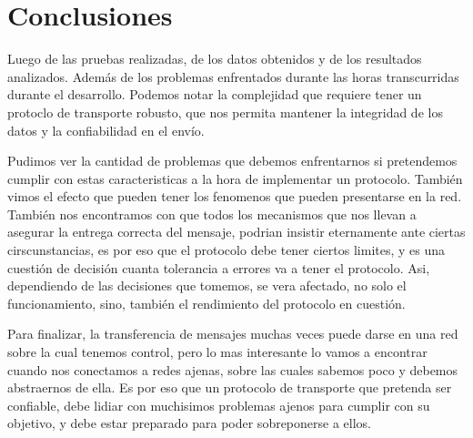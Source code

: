 \section{Conclusiones}

Luego de las pruebas realizadas, de los datos obtenidos y de los resultados analizados. Adem\'as de los problemas enfrentados durante las horas transcurridas durante el desarrollo. Podemos notar la complejidad que requiere tener un protoclo de transporte robusto, que nos permita mantener la integridad de los datos y la confiabilidad en el env\'io.

Pudimos ver la cantidad de problemas que debemos enfrentarnos si pretendemos cumplir con estas caracteristicas a la hora de implementar un protocolo. Tambi\'en vimos el efecto que pueden tener los fenomenos que pueden presentarse en la red.
Tambi\'en nos encontramos con que todos los mecanismos que nos llevan a asegurar la entrega correcta del mensaje, podrian insistir eternamente ante ciertas cirscunstancias, es por eso que el protocolo debe tener ciertos limites, y es una cuesti\'on de decisi\'on cuanta tolerancia a errores va a tener el protocolo. Asi, dependiendo de las decisiones que tomemos, se vera afectado, no solo el funcionamiento, sino, tambi\'en el rendimiento del protocolo en cuesti\'on.

Para finalizar, la transferencia de mensajes muchas veces puede darse en una red sobre la cual tenemos control, pero lo mas interesante lo vamos a encontrar cuando nos conectamos a redes ajenas, sobre las cuales sabemos poco y debemos abstraernos de ella. Es por eso que un protocolo de transporte que pretenda ser confiable, debe lidiar con muchisimos problemas ajenos para cumplir con su objetivo, y debe estar preparado para poder sobreponerse a ellos.